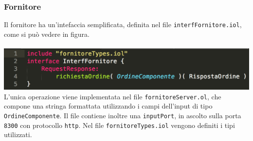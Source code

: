\subsubsection*{Fornitore}
Il fornitore ha un'intefaccia semplificata, definita nel file
{\tt interfFornitore.iol}, come si pu\`o vedere in figura. \\\\
\includegraphics[scale=0.5]{immagini/interfFornitore.png}\\
L'unica operazione viene implementata nel file {\tt fornitoreServer.ol},
che compone una stringa formattata utilizzando i campi dell'input di
tipo {\tt OrdineComponente}.
Il file contiene inoltre una {\tt inputPort}, in ascolto sulla porta
{\tt 8300} con protocollo {\tt http}.
Nel file {\tt fornitoreTypes.iol} vengono definiti i tipi utilizzati.
